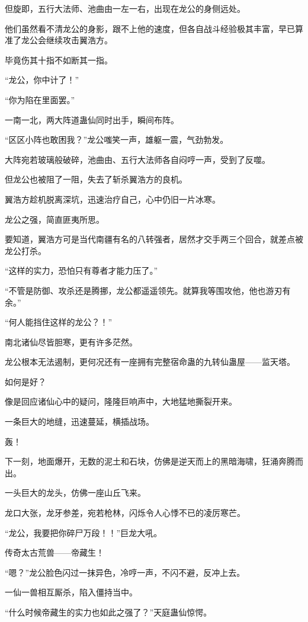 \begin{this_body}
但旋即，五行大法师、池曲由一左一右，出现在龙公的身侧远处。

他们虽然看不清龙公的身影，跟不上他的速度，但各自战斗经验极其丰富，早已算准了龙公会继续攻击翼浩方。

毕竟伤其十指不如断其一指。

“龙公，你中计了！”

“你为陷在里面罢。”

一南一北，两大阵道蛊仙同时出手，瞬间布阵。

“区区小阵也敢困我？”龙公嗤笑一声，雄躯一震，气劲勃发。

大阵宛若玻璃般破碎，池曲由、五行大法师各自闷哼一声，受到了反噬。

但龙公也被阻了一阻，失去了斩杀翼浩方的良机。

翼浩方趁机脱离深坑，迅速治疗自己，心中仍旧一片冰寒。

龙公之强，简直匪夷所思。

要知道，翼浩方可是当代南疆有名的八转强者，居然才交手两三个回合，就差点被龙公打杀。

“这样的实力，恐怕只有尊者才能力压了。”

“不管是防御、攻杀还是腾挪，龙公都遥遥领先。就算我等围攻他，他也游刃有余。”

“何人能挡住这样的龙公？！”

南北诸仙尽皆胆寒，更有许多茫然。

龙公根本无法遏制，更何况还有一座拥有完整宿命蛊的九转仙蛊屋——监天塔。

如何是好？

像是回应诸仙心中的疑问，隆隆巨响声中，大地猛地撕裂开来。

一条巨大的地缝，迅速蔓延，横插战场。

轰！

下一刻，地面爆开，无数的泥土和石块，仿佛是逆天而上的黑暗海啸，狂涌奔腾而出。

一头巨大的龙头，仿佛一座山丘飞来。

龙口大张，龙牙参差，宛若枪林，闪烁令人心悸不已的凌厉寒芒。

“龙公，我要把你碎尸万段！！”巨龙大吼。

传奇太古荒兽——帝藏生！

“嗯？”龙公脸色闪过一抹异色，冷哼一声，不闪不避，反冲上去。

一仙一兽相互厮杀，陷入僵持当中。

“什么时候帝藏生的实力也如此之强了？”天庭蛊仙惊愕。


\end{this_body}
